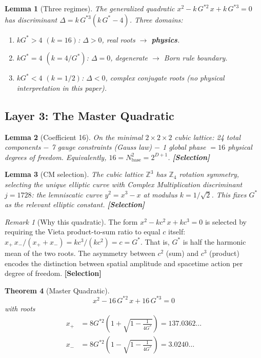 \documentclass[12pt]{article}
\newtheorem{theorem}{Theorem}[section]
\newtheorem{lemma}[theorem]{Lemma}
\theoremstyle{definition}
\theoremstyle{remark}
\newtheorem{remark}{Remark}[section]
\newcommand{\epi}[1]{\textnormal{{\small\sffamily\bfseries\color{ftdblue}[#1]}}}
\begin{document}
\begin{lemma}[Three regimes]\label{lem:disc}
The generalized quadratic $x^2 - k\,G^{*2}\,x + k\,G^{*3} = 0$ has discriminant
$\Delta = k\,G^{*3}(k\,G^{*} - 4)$. Three domains:
\begin{enumerate}[nosep]
\item $kG^{*} > 4$ $(k=16)$: $\Delta > 0$, real roots $\to$ \textbf{physics}.
\item $kG^{*} = 4$ $(k=4/G^{*})$: $\Delta = 0$, degenerate $\to$ Born rule boundary.
\item $kG^{*} < 4$ $(k=1/2)$: $\Delta < 0$, complex conjugate roots (no physical interpretation in this paper).
\end{enumerate}
\end{lemma}

\subsection{Layer 3: The Master Quadratic}

\begin{lemma}[Coefficient 16]\label{lem:16}
On the minimal $2\times 2\times 2$ cubic lattice: 24 total components $-$ 7 gauge
constraints (Gauss law) $-$ 1 global phase $= 16$ physical degrees of freedom.
Equivalently, $16 = N_\text{base}^2 = 2^{D+1}$. \epi{Selection}
\end{lemma}

\begin{lemma}[CM selection]\label{lem:cm}
The cubic lattice $\mathbb{Z}^3$ has $\mathbb{Z}_4$ rotation symmetry, selecting the
unique elliptic curve with Complex Multiplication discriminant $j = 1728$: the
lemniscatic curve $y^2 = x^3 - x$ at modulus $k = 1/\sqrt{2}$. This fixes
$G^{*}$ as the relevant elliptic constant. \epi{Selection}
\end{lemma}

\begin{remark}[Why this quadratic]
The form $x^2 - kc^2\,x + kc^3 = 0$ is selected by requiring the
Vieta product-to-sum ratio to equal $c$ itself:
$x_+\,x_-/(x_+ + x_-) = kc^3/(kc^2) = c = G^{*}$.
That is, $G^{*}$ is half the harmonic mean of the two roots.
The asymmetry between $c^2$ (sum) and $c^3$ (product) encodes the
distinction between spatial amplitude and spacetime action per degree of freedom. \epi{Selection}
\end{remark}

\begin{theorem}[Master Quadratic]\label{thm:master}
\begin{equation}
\boxed{x^2 - 16\,G^{*2}\,x + 16\,G^{*3} = 0}
\end{equation}
with roots
\begin{align}
x_+ &= 8G^{*2}\!\left(1 + \sqrt{1 - \tfrac{1}{4G^{*}}}\right) = 137.0362\ldots \label{eq:xplus}\\
x_- &= 8G^{*2}\!\left(1 - \sqrt{1 - \tfrac{1}{4G^{*}}}\right) = 3.0240\ldots \label{eq:xminus}
\end{align}
\end{theorem}
\end{document}
